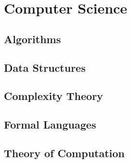 \chapter{Computer Science}


\section{Algorithms}


\section{Data Structures}




\section{Complexity Theory}


\section{Formal Languages}

\section{Theory of Computation}





\begin{comment}


\end{comment}